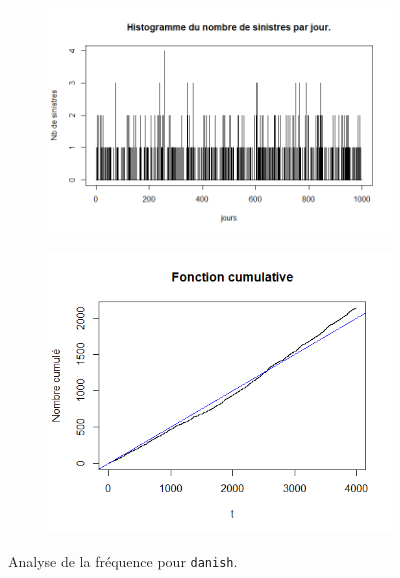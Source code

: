 		\begin{figure}[H]
			\begin{center}
				\begin{subfigure}[b]{0.52\textwidth}
					\includegraphics[scale=0.5]{Graphiques/Hist_Danish_Frequence} 
					\caption{} \label{Hist_Danish_Frequence}
				\end{subfigure}
			\begin{subfigure}[b]{0.42\textwidth}
				\includegraphics[scale=0.5]{Graphiques/Graph_Danish_FreqCumul} 
				\caption{} \label{Graph_Danish_FreqCumul}
			\end{subfigure}
			\renewcommand{\figurename}{Illustration}
			\caption{Analyse de la fréquence pour \texttt{danish}.}\label{Graph_Freq_Danish}
			\end{center}
		\end{figure}
		
